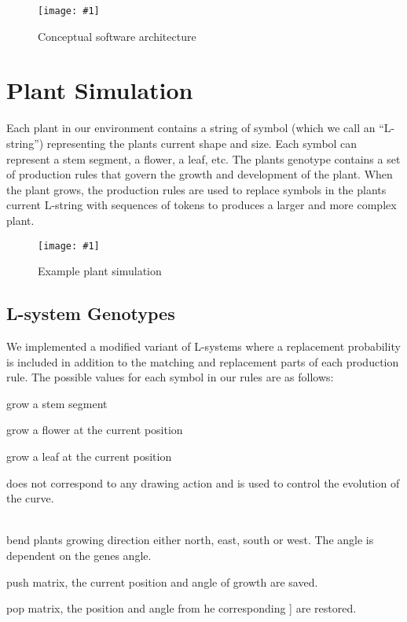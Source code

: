 \documentclass[conference]{acmsiggraph}
\newcommand{\onecol}[3]{
  \begin{figure}
    \centering
    \texttt{[image: \#1]}
    \vspace{0.0in}%
    \caption{#3}
    \label{#2}
  \end{figure}
}
\begin{document}
\onecol{images/architecture.png}{arch}{Conceptual software architecture}

\section{Plant Simulation}

Each plant in our environment contains a string of symbol (which we call an
``L-string'') representing the plants current shape and size. Each symbol can
represent a stem segment, a flower, a leaf, etc. The plants genotype contains a
set of production rules that govern the growth and development of the plant.
When the plant grows, the production rules are used to replace symbols in the
plants current L-string with sequences of tokens to produces a larger and more
complex plant.

\onecol{images/screenshot.png}{screen}{Example plant simulation}

\subsection{L-system Genotypes}

We implemented a modified variant of L-systems where a replacement probability
is included in addition to the matching and replacement parts of each production
rule. The possible values for each symbol in our rules are as follows:

\begin{description}[leftmargin=!,labelindent=0.2in,labelwidth=0.1in]
  \item[G]   grow a stem segment
  \item[F]   grow a flower at the current position
  \item[L]   grow a leaf at the current position
  \item[X]   does not correspond to any drawing action and is used to control
             the evolution of the curve.\cite{lsystems}
  \item[n, e, s, w] \hfill \\
             bend plants growing direction either north, east, south or west.
             The angle is dependent on the genes angle.
  \item[{[}] push matrix, the current position and angle of growth are saved.
  \item[{]}] pop matrix, the position and angle from he corresponding {]} are
             restored.
\end{description}
\end{document}
